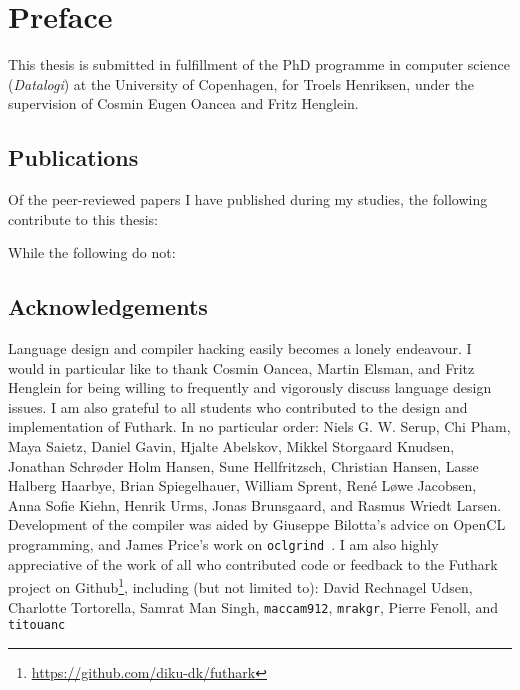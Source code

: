{}
\chapter*{Preface}

This thesis is submitted in fulfillment of the PhD programme in
computer science (\textit{Datalogi}) at the University of Copenhagen,
for Troels Henriksen, under the supervision of Cosmin Eugen Oancea and
Fritz Henglein.

\section{Publications}

Of the peer-reviewed papers I have published during my studies, the
following contribute to this thesis:

\begin{quote}
\end{quote}
\begin{quote}
\end{quote}
\begin{quote}
\end{quote}

\noindent While the following do not:

\begin{quote}
\end{quote}
\begin{quote}
\end{quote}
\begin{quote}
\end{quote}

\section{Acknowledgements}

Language design and compiler hacking easily becomes a lonely
endeavour.  I would in particular like to thank Cosmin Oancea, Martin
Elsman, and Fritz Henglein for being willing to frequently and
vigorously discuss language design issues.  I am also grateful to all
students who contributed to the design and implementation of Futhark.
In no particular order: Niels G. W. Serup, Chi Pham, Maya Saietz,
Daniel Gavin, Hjalte Abelskov, Mikkel Storgaard Knudsen, Jonathan
Schrøder Holm Hansen, Sune Hellfritzsch, Christian Hansen, Lasse
Halberg Haarbye, Brian Spiegelhauer, William Sprent, René Løwe
Jacobsen, Anna Sofie Kiehn, Henrik Urms, Jonas Brunsgaard, and Rasmus
Wriedt Larsen.  Development of the compiler was aided by Giuseppe
Bilotta's advice on OpenCL programming, and James Price's work on
\texttt{oclgrind}~\cite{price2015oclgrind}.  I am also highly
appreciative of the work of all who contributed code or feedback to
the Futhark project on
Github\footnote{\url{https://github.com/diku-dk/futhark}}, including
(but not limited to): David Rechnagel Udsen, Charlotte Tortorella,
Samrat Man Singh, \texttt{maccam912}, \texttt{mrakgr}, Pierre Fenoll,
and \texttt{titouanc}


